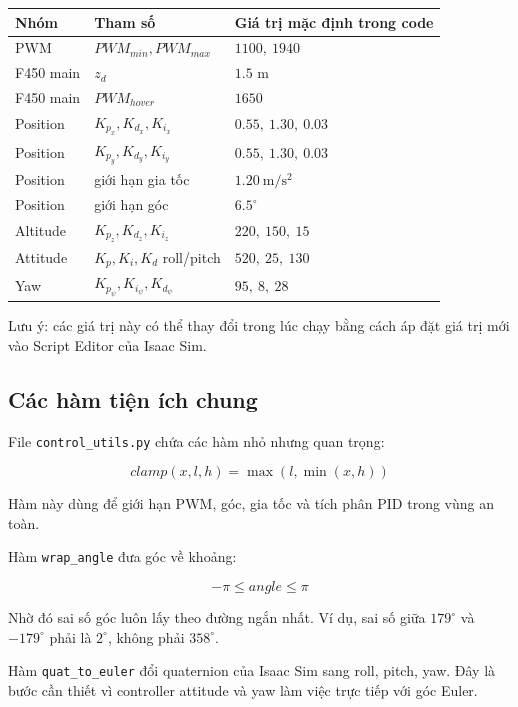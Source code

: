 \begin{center}
\begin{tabular}{|l|l|l|}
\hline
Nhóm & Tham số & Giá trị mặc định trong code \\
\hline
PWM & $PWM_{min}, PWM_{max}$ & $1100,\ 1940$ \\
\hline
F450 main & $z_d$ & $1.5$ m \\
\hline
F450 main & $PWM_{hover}$ & $1650$  \\
\hline
Position & $K_{p_x},K_{d_x},K_{i_x}$ & $0.55,\ 1.30,\ 0.03$ \\
\hline
Position & $K_{p_y},K_{d_y},K_{i_y}$ & $0.55,\ 1.30,\ 0.03$ \\
\hline
Position & giới hạn gia tốc & $1.20\ \mathrm{m/s^2}$ \\
\hline
Position & giới hạn góc & $6.5^\circ$ \\
\hline
Altitude & $K_{p_z},K_{d_z},K_{i_z}$ & $220,\ 150,\ 15$ \\
\hline
Attitude & $K_{p},K_i,K_d$ roll/pitch & $520,\ 25,\ 130$ \\
\hline
Yaw & $K_{p_\psi},K_{i_\psi},K_{d_\psi}$ & $95,\ 8,\ 28$ \\
\hline
\end{tabular}
\end{center}

Lưu ý: các giá trị này có thể thay đổi trong lúc chạy bằng cách áp đặt giá trị mới vào Script Editor của Isaac Sim. 

\subsection{Các hàm tiện ích chung}

File \texttt{control\_utils.py} chứa các hàm nhỏ nhưng quan trọng:

\begin{equation}
    clamp(x,l,h)=\max(l,\min(x,h))
\end{equation}

Hàm này dùng để giới hạn PWM, góc, gia tốc và tích phân PID trong vùng an toàn.

Hàm \texttt{wrap\_angle} đưa góc về khoảng:

\begin{equation}
    -\pi \leq angle \leq \pi
\end{equation}

Nhờ đó sai số góc luôn lấy theo đường ngắn nhất. Ví dụ, sai số giữa
$179^\circ$ và $-179^\circ$ phải là $2^\circ$, không phải $358^\circ$.

Hàm \texttt{quat\_to\_euler} đổi quaternion của Isaac Sim sang roll, pitch,
yaw. Đây là bước cần thiết vì controller attitude và yaw làm việc trực tiếp với
góc Euler.
